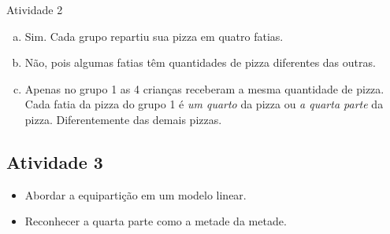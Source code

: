 \begin{multicols}{2}
\begin{resposta*}{Atividade 2}
\begin{enumerate} [a),wide,labelindent=0pt] %
    \item       Sim. Cada grupo repartiu sua pizza em quatro fatias.
    \item       Não, pois algumas fatias têm quantidades de pizza diferentes das outras.
    \item       Apenas no grupo 1 as 4 crianças receberam a mesma quantidade de pizza. Cada fatia da pizza do grupo 1 é {\it um quarto} da pizza ou {\it a quarta parte} da pizza. Diferentemente das demais pizzas.
\end{enumerate} %
\end{resposta*}



\subsection{Atividade 3}
  \vspace{.1cm}
  
\begin{itemize} %
    \item       Abordar a equipartição em um modelo linear.
    \item       Reconhecer a quarta parte como a metade da metade.
\end{itemize} %
 \vspace{.1cm}
 
   \vspace{.1cm}


\end{multicols}
